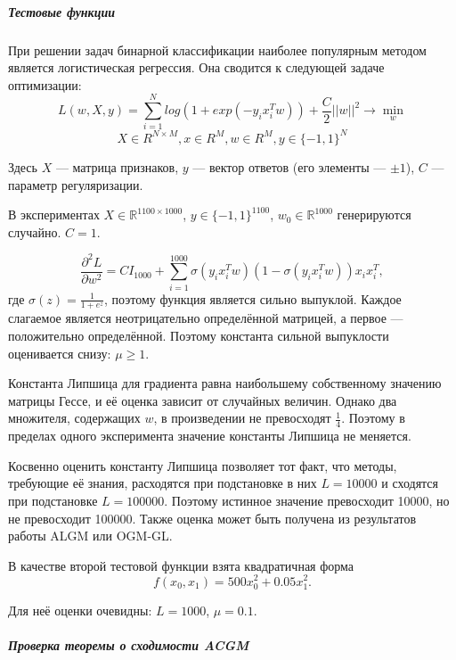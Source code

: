 \documentclass{crm-article}
\begin{document}
\subparagraph{Тестовые функции}

При решении задач бинарной классификации наиболее популярным методом является логистическая регрессия. Она сводится к следующей задаче оптимизации:
$$ L(w, X, y) = \sum_{i = 1}^{N} log (1 + exp(-y_ix_i^Tw)) + \frac{C}{2} ||w||^2 \longrightarrow \min_w$$
$$X \in R^{N \times M}, x \in R^{M}, w \in R^{M}, y \in \{-1, 1\}^N$$

Здесь $X$ --- матрица признаков, $y$ --- вектор ответов (его элементы --- $\pm 1$), $C$ --- параметр регуляризации.

В экспериментах $X\in \mathbb{R}^{1100\times 1000}$, $y\in \{-1,1\}^{1100}$, $w_0\in\mathbb{R}^{1000}$ генерируются случайно. $C=1$.

$$\frac{\partial^2 L}{\partial w^2}=CI_{1000}+\sum_{i=1}^{1000}\sigma(y_ix_i^Tw)(1-\sigma(y_ix_i^Tw))x_ix_i^T,$$ где $\sigma(z)=\frac{1}{1+e^z}$, поэтому функция является сильно выпуклой. Каждое слагаемое является неотрицательно определённой матрицей, а первое --- положительно определённой. Поэтому константа сильной выпуклости оценивается снизу: $\mu\geq 1$.

Константа Липшица для градиента равна наибольшему собственному значению матрицы Гессе, и её оценка зависит от случайных величин. Однако два множителя, содержащих $w$, в произведении не превосходят $\frac{1}{4}$. Поэтому в пределах одного эксперимента значение константы Липшица не меняется.

Косвенно оценить константу Липшица позволяет тот факт, что методы, требующие её знания, расходятся при подстановке в них $L=10000$ и сходятся при подстановке $L=100000$. Поэтому истинное значение превосходит 10000, но не превосходит 100000. Также оценка может быть получена из результатов работы ALGM или OGM-GL.

В качестве второй тестовой функции взята квадратичная форма $$f(x_0, x_1)=500x_0^2+0.05x_1^2.$$

Для неё оценки очевидны: $L=1000$, $\mu=0.1$.

\subparagraph{Проверка теоремы о сходимости ACGM}
\end{document}

